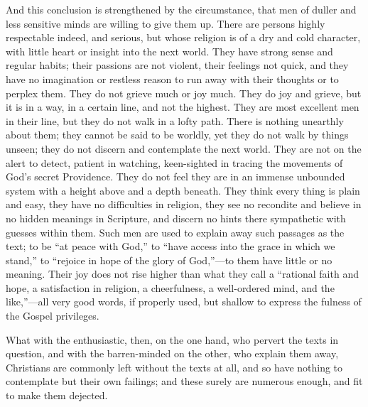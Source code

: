 And this conclusion is strengthened by the circumstance, that men
of duller and less sensitive minds are willing to give them up. There
are persons highly respectable indeed, and serious, but whose religion
is of a dry and cold character, with little heart or insight into the
next world. They have strong sense and regular habits; their passions
are not violent, their feelings not quick, and they have no
imagination or restless reason to run away with their thoughts or to
perplex them. They do not grieve much or joy much. They do joy and
grieve, but it is in a way, in a certain line, and not the highest.
They are most excellent men in their line, but they do not walk in a
lofty path. There is nothing unearthly about them; they cannot be said
to be worldly, yet they do not walk by things unseen; they do not
discern and contemplate the next world. They are not on the alert to
detect, patient in watching, keen-sighted in tracing the movements of
God's secret Providence. They do not feel they are in an immense
unbounded system with a height above and a depth beneath. They think
every thing is plain and easy, they have no difficulties in religion,
they see no recondite and believe in no hidden meanings in Scripture,
and discern no hints there sympathetic with guesses within them. Such
men are used to explain away such passages as the text; to be ``at
peace with God,'' to ``have access into the grace in which we
stand,'' to ``rejoice in hope of the glory of God,''—to
them have little or no meaning. Their joy does not rise higher than
what they call a ``rational faith and hope, a satisfaction in
religion, a cheerfulness, a well-ordered mind, and the like,''—all
very good words, if properly used, but shallow to express the fulness
of the Gospel privileges.

What with the enthusiastic, then, on the one hand, who pervert the
texts in question, and with the barren-minded on the other, who
explain them away, Christians are commonly left without the texts at
all, and so have nothing to contemplate but their own failings; and
these surely are numerous enough, and fit to make them dejected.


